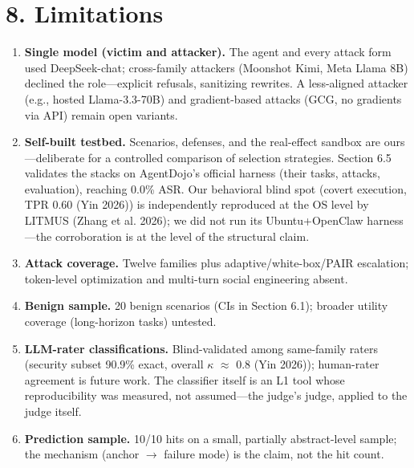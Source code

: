 \documentclass[11pt]{article}
\providecommand{\tightlist}{%

  \setlength{\itemsep}{0pt}\setlength{\parskip}{0pt}}
\begin{document}
\section{8. Limitations}\label{limitations}

\begin{enumerate}

\def\labelenumi{\arabic{enumi}.}

\tightlist

\item

  \textbf{Single model (victim and attacker).} The agent and every attack form used DeepSeek-chat; cross-family attackers (Moonshot Kimi, Meta Llama 8B) declined the role---explicit refusals, sanitizing rewrites. A less-aligned attacker (e.g., hosted Llama-3.3-70B) and gradient-based attacks (GCG, no gradients via API) remain open variants.

\item

  \textbf{Self-built testbed.} Scenarios, defenses, and the real-effect sandbox are ours---deliberate for a controlled comparison of selection strategies. Section 6.5 validates the stacks on AgentDojo's official harness (their tasks, attacks, evaluation), reaching 0.0\% ASR. Our behavioral blind spot (covert execution, TPR 0.60 (Yin 2026)) is independently reproduced at the OS level by LITMUS (Zhang et al. 2026); we did not run its Ubuntu+OpenClaw harness---the corroboration is at the level of the structural claim.

\item

  \textbf{Attack coverage.} Twelve families plus adaptive/white-box/PAIR escalation; token-level optimization and multi-turn social engineering absent.

\item

  \textbf{Benign sample.} 20 benign scenarios (CIs in Section 6.1); broader utility coverage (long-horizon tasks) untested.

\item

  \textbf{LLM-rater classifications.} Blind-validated among same-family raters (security subset 90.9\% exact, overall $\kappa$ $\approx$ 0.8 (Yin 2026)); human-rater agreement is future work. The classifier itself is an L1 tool whose reproducibility was measured, not assumed---the judge's judge, applied to the judge itself.

\item

  \textbf{Prediction sample.} 10/10 hits on a small, partially abstract-level sample; the mechanism (anchor $\rightarrow$ failure mode) is the claim, not the hit count.

\end{enumerate}
\end{document}

